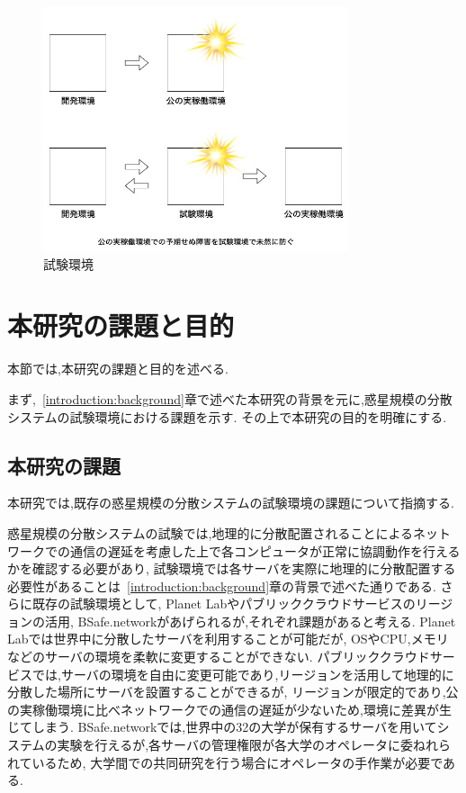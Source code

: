 \begin{figure}[htbp]
  \begin{center}
    \includegraphics[width=0.8\textwidth]{./figures/staging.jpg}
    \caption{試験環境}
  \end{center}
\end{figure}

\section{本研究の課題と目的}
\label{introduction:issue-aim}

本節では,本研究の課題と目的を述べる.

まず,~\ref{introduction:background}章で述べた本研究の背景を元に,惑星規模の分散システムの試験環境における課題を示す.
その上で本研究の目的を明確にする.

\subsection{本研究の課題}
\label{introduction:issue-aim:issue}

本研究では,既存の惑星規模の分散システムの試験環境の課題について指摘する.

惑星規模の分散システムの試験では,地理的に分散配置されることによるネットワークでの通信の遅延を考慮した上で各コンピュータが正常に協調動作を行えるかを確認する必要があり,
試験環境では各サーバを実際に地理的に分散配置する必要性があることは~\ref{introduction:background}章の背景で述べた通りである.
さらに既存の試験環境として, Planet Labやパブリッククラウドサービスのリージョンの活用, BSafe.networkがあげられるが,それぞれ課題があると考える.
Planet Labでは世界中に分散したサーバを利用することが可能だが, OSやCPU,メモリなどのサーバの環境を柔軟に変更することができない.
パブリッククラウドサービスでは,サーバの環境を自由に変更可能であり,リージョンを活用して地理的に分散した場所にサーバを設置することができるが,
リージョンが限定的であり,公の実稼働環境に比べネットワークでの通信の遅延が少ないため,環境に差異が生じてしまう.
BSafe.networkでは,世界中の32の大学が保有するサーバを用いてシステムの実験を行えるが,各サーバの管理権限が各大学のオペレータに委ねれられているため,
大学間での共同研究を行う場合にオペレータの手作業が必要である.

